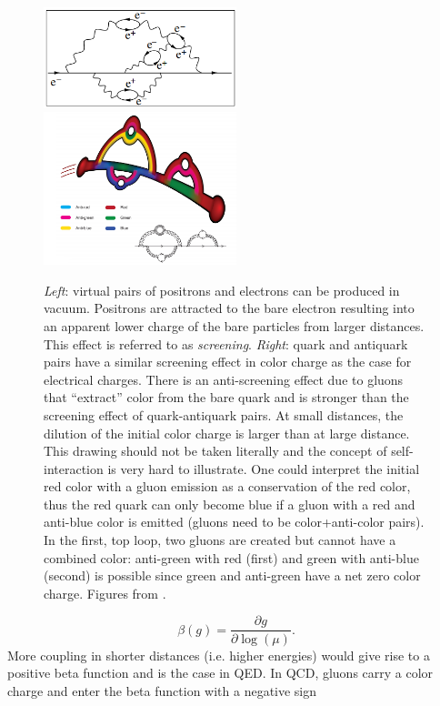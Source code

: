 \begin{figure}
\includegraphics[width=0.5\textwidth,height=0.3\textwidth]{chapter1/img/screening}
\includegraphics[width=0.5\textwidth,height=0.3\textwidth]{chapter1/img/antiscreening}
\caption{\textit{Left}: virtual pairs of positrons and electrons can be produced in vacuum. Positrons are attracted to the bare electron resulting into an apparent lower charge of the bare particles from larger distances. This effect is referred to as \textit{screening}. \textit{Right}: quark and antiquark pairs have a similar screening effect in color charge as the case for electrical charges. There is an anti-screening effect due to gluons that ``extract'' color from the bare quark and is stronger than the screening effect of quark-antiquark pairs. At small distances, the dilution of the initial color charge is larger than at large distance.  This drawing should not be taken literally and the concept of self-interaction is very hard to illustrate. One could interpret the initial red color with a gluon emission as a conservation of the red color, thus the red quark can only become blue if a gluon with a red and anti-blue color is emitted (gluons need to be color+anti-color pairs). In the first, top loop, two  gluons are created but cannot have a combined color: anti-green with red (first) and green with anti-blue (second) is possible since green and anti-green have a net zero color charge. Figures from \cite{Deur:2016tte}.}
\label{fig:screening}
\end{figure}

\begin{equation}
\beta\left(g\right) = \frac{\partial g}{\partial \log\left(\mu\right)}.
\end{equation}
More coupling in shorter distances (i.e. higher energies) would give rise to a positive beta function and is the case in QED. In QCD, gluons carry a color charge and enter the beta function with a negative sign

